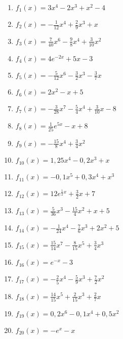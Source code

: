 \begin{Exercise}[title={\raggedright Bestimme jeweils die erste, zweite und dritte Ableitung.}, label=hoehereAbleitungenA1]

	\begin{enumerate}[label=\alph*)]
		\item \(f_1(x)=3x^4-2x^3+x^2-4\)
		\item \(f_2(x)=-\frac{1}{12}x^4+\frac{2}{9}x^3+x\)
		\item \(f_3(x)=\frac{7}{40}x^6-\frac{9}{8}x^4+\frac{3}{10}x^2\)
		\item \(f_4(x)=4e^{-2x}+5x-3\)
		\item \(f_5(x)=-\frac{5}{12}x^6-\frac{3}{2}x^3-\frac{3}{7}x\)
		\item \(f_6(x)=2x^2-x+5\)
		\item \(f_7(x)=-\frac{3}{28}x^7-\frac{5}{4}x^4+\frac{3}{10}x-8\)
		\item \(f_8(x)=\frac{1}{25}e^{5x}-x+8\)
		\item \(f_9(x)=-\frac{15}{8}x^4+\frac{3}{4}x^2\)
		\item \(f_{10}(x)=1,25x^4-0,2x^3+x\)
		\item \(f_{11}(x)=-0,1x^5+0,3x^4+x^3\)
		\item \(f_{12}(x)=12e^{\frac{1}{2}x}+\frac{3}{2}x+7\)
		\item \(f_{13}(x)=\frac{5}{36}x^3-\frac{15}{4}x^2+x+5\)
		\item \(f_{14}(x)=-\frac{1}{24}x^4-\frac{7}{6}x^3+2x^2+5\)
		\item \(f_{15}(x)=\frac{15}{14}x^7-\frac{8}{15}x^5+\frac{3}{4}x^3\)
		\item \(f_{16}(x)=e^{-x}-3\)
		\item \(f_{17}(x)=-\frac{2}{5}x^4-\frac{5}{9}x^3+\frac{7}{2}x^2\)
		\item \(f_{18}(x)=\frac{14}{15}x^5+\frac{2}{15}x^3+\frac{2}{7}x\)
		\item \(f_{19}(x)=0,2x^6-0,1x^4+0,5x^2\)
		\item \(f_{20}(x)=-e^{x}-x\)
	\end{enumerate}
\end{Exercise}
